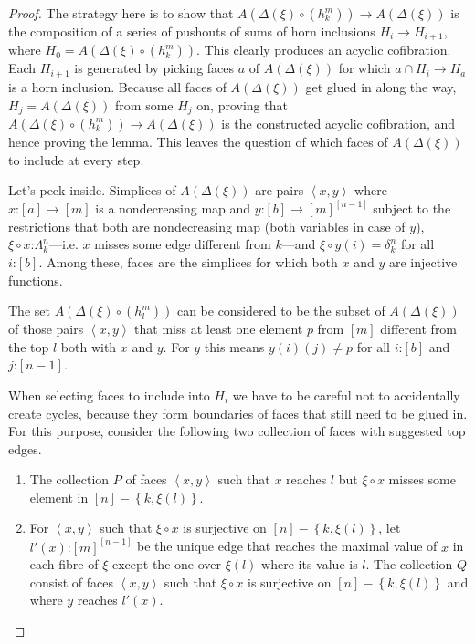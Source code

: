\documentclass{tac}
\newcommand\of{\mathord:}
\newcommand\set[1]{\left\{#1\right\}}
\newcommand\tuplet[1]{\left\langle{} #1 \right\rangle}
\newcommand\horn[2]{\Lambda^{#1}_{#2}}
\newcommand\Y{\Delta}
\begin{document}
\begin{proof}
  The strategy here is to show that \( A(\Y(\xi)\circ(h^m_k))\to A(\Y(\xi)) \) 
  is the composition of a series of pushouts of sums of horn inclusions \(
    H_i\to H_{i+1} \), where \( H_0 = A(\Y(\xi)\circ(h^m_k)) \).
  This clearly produces an acyclic cofibration.
  Each \(H_{i+1}\) is generated by picking faces \(a\) of \(A(\Y(\xi))\) for 
  which \(a\cap H_i\to H_a\) is a horn inclusion. Because all faces of 
  \(A(\Y(\xi))\) get glued in along the way, \(H_j=A(\Y(\xi))\) from some 
  \(H_j\) on, proving that  \( A(\Y(\xi)\circ(h^m_k))\to A(\Y(\xi)) \) is the
  constructed acyclic cofibration, and hence proving the lemma.
  This leaves the question of which faces of  \(A(\Y(\xi))\) to include at every 
  step.
  
  Let's peek inside. Simplices of \( A(\Y(\xi)) \) are pairs \(\tuplet{x,y}\)
  where \(x\of[a]\to [m]\) is a nondecreasing map and \(
    y\of [b]\to{[m]}^{[n-1]}\) subject to the restrictions that both are 
  nondecreasing map (both variables in case of \(y\)), \(
    \xi\circ x\of \horn{n}{k}\)---i.e. \(x\) misses some edge different from 
  \(k\)---and \(\xi\circ y(i) = \delta^n_k \) for all \( i\of [b] \). Among 
  these, faces are the simplices for which both \(x\) and \(y\) are injective 
  functions.

  The set \( A(\Y(\xi)\circ(h^m_l)) \) can be considered to be the subset of 
  \( A(\Y(\xi)) \) of those pairs \(\tuplet{x,y}\) that miss at least one element
  \(p\) from \([m]\) different from the top \(l\) both with \(x\) and \(y\). 
  For \(y\) this means \(y(i)(j)\neq p\) for all \(i\of[b]\) and \(j\of[n-1]\).

  When selecting faces to include into \(H_i\) we have to be careful not to
  accidentally create cycles, because they form boundaries of faces that
  still need to be glued in. For this purpose, consider the following two
  collection of faces with suggested top edges.
  \begin{enumerate}
    \item The collection \(P\) of faces \( \tuplet{x,y} \) such that \( x \) 
    reaches \(l\) but \(\xi\circ x\) misses some element in 
    \([n]-\set{k,\xi(l)}\).
    \item For \( \tuplet{x,y} \) such that 
    \( \xi\circ x \) is surjective on \([n]-\set{k,\xi(l)}\), 
    let \(l'(x)\of {[m]}^{[n-1]}\) be the unique edge that reaches 
    the maximal value of \(x\) in each fibre of \(\xi \) except the one over
    \(\xi(l)\) where its value is \(l\).
    The collection \(Q\) consist of faces \( \tuplet{x,y} \) such that 
    \( \xi\circ x \) is surjective on \([n]-\set{k,\xi(l)}\)
    and where \(y\) reaches \(l'(x)\).
  \end{enumerate}


\end{proof}
\end{document}
